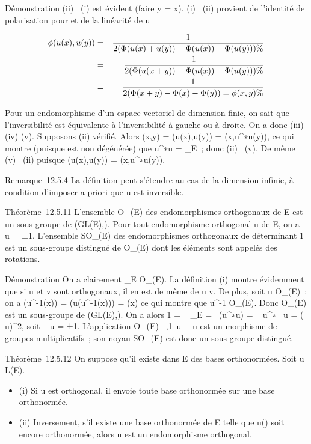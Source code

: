 \documentclass[]{article}
\begin{document}
Démonstration (ii) \rigtharrow~(i) est évident (faire y = x). (i) \rigtharrow~(ii) provient de
l'identité de polarisation pour \Phi et de la linéarité de u

\begin{align*} \phi(u(x),u(y))& =& 1
\over 2 (\Phi(u(x) + u(y)) - \Phi(u(x)) - \Phi(u(y)))\%&
\\ & =& 1 \over 2
(\Phi(u(x + y)) - \Phi(u(x)) - \Phi(u(y))) \%& \\
& =& 1 \over 2 (\Phi(x + y) - \Phi(x) - \Phi(y)) = \phi(x,y)
\%& \\ \end{align*}

Pour un endomorphisme d'un espace vectoriel de dimension finie, on sait
que l'inversibilité est équivalente à l'inversibilité à gauche ou à
droite. On a donc (iii) \Leftrightarrow (iv)
\Leftrightarrow (v). Supposons (ii) vérifié. Alors \phi(x,y) =
\phi(u(x),u(y)) = \phi(x,u^∗\cdot u(y)), ce qui montre (puisque \phi est
non dégénérée) que u^∗\cdot u =
\mathrmId_E~; donc (ii) \rigtharrow~(v). De même (v)
\rigtharrow~(ii) puisque \phi(u(x),u(y)) = \phi(x,u^∗\cdot u(y)).

Remarque~12.5.4 La définition peut s'étendre au cas de la dimension
infinie, à condition d'imposer a priori que u est inversible.

Théorème~12.5.11 L'ensemble O_\Phi(E) des endomorphismes
orthogonaux de E est un sous groupe de (GL(E),\cdot). Pour tout
endomorphisme orthogonal u de E, on a
~ u = ±1.
L'ensemble SO_\Phi(E) des endomorphismes orthogonaux de
déterminant 1 est un sous-groupe distingué de O_\Phi(E) dont les
éléments sont appelés des rotations.

Démonstration On a clairement \mathrmId_E \in
O_\Phi(E). La définition (i) montre évidemment que si u et v sont
orthogonaux, il en est de même de u \cdot v. De plus, soit u \in
O_\Phi(E)~; on a \Phi(u^-1(x)) = \Phi(u(u^-1(x)))
= \Phi(x) ce qui montre que u^-1 \in O_\Phi(E). Donc
O_\Phi(E) est un sous-groupe de (GL(E),\cdot). On a alors 1
= ~
\mathrmId_E =\
 (u^∗\cdot u)
= ~
u^∗~ u
= (~
u)^2, soit
\mathrm{det}~ u = ±1.
L'application O_\Phi(E) \rightarrow~,1\,
u\mapsto~~
u est un morphisme de groupes multiplicatifs~; son noyau
SO_\Phi(E) est donc un sous-groupe distingué.

Théorème~12.5.12 On suppose qu'il existe dans E des bases orthonormées.
Soit u \in L(E).

\begin{itemize}
\itemsep1pt\parskip0pt
\item
  (i) Si u est orthogonal, il envoie toute base orthonormée sur une base
  orthonormée.
\item
  (ii) Inversement, s'il existe une base orthonormée  de E telle que
  u(\mathcal{E}) soit encore orthonormée, alors u est un endomorphisme orthogonal.
\end{itemize}
\end{document}
